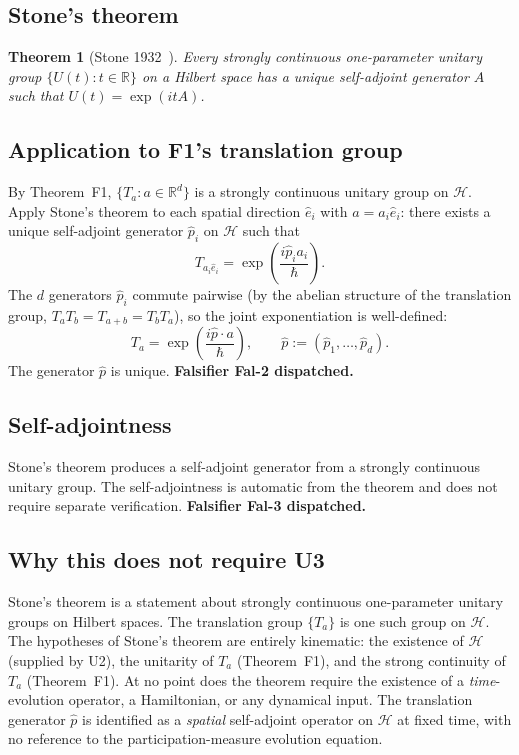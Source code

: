 \documentclass[11pt,a4paper]{article}
\newtheorem{theorem}{Theorem}[section]
\begin{document}
\subsection{Stone's theorem}

\begin{theorem}[Stone 1932~\cite{stone}]
Every strongly continuous one-parameter unitary group $\{U(t) : t \in \mathbb{R}\}$ on a Hilbert space has a unique self-adjoint generator $A$ such that $U(t) = \exp(itA)$.
\end{theorem}

\subsection{Application to F1's translation group}

By Theorem~F1, $\{T_a : a \in \mathbb{R}^d\}$ is a strongly continuous unitary group on $\mathcal{H}$. Apply Stone's theorem to each spatial direction $\hat{e}_i$ with $a = a_i \hat{e}_i$: there exists a unique self-adjoint generator $\hat{p}_i$ on $\mathcal{H}$ such that
\[
T_{a_i \hat{e}_i} = \exp\!\left(\frac{i \hat{p}_i a_i}{\hbar}\right).
\]
The $d$ generators $\hat{p}_i$ commute pairwise (by the abelian structure of the translation group, $T_a T_b = T_{a+b} = T_b T_a$), so the joint exponentiation is well-defined:
\begin{equation}
T_a = \exp\!\left(\frac{i \hat{p} \cdot a}{\hbar}\right), \qquad \hat{p} := (\hat{p}_1, \ldots, \hat{p}_d). \label{eq:Ta-stone}
\end{equation}
The generator $\hat{p}$ is unique. \textbf{Falsifier Fal-2 dispatched.}

\subsection{Self-adjointness}

Stone's theorem produces a self-adjoint generator from a strongly continuous unitary group. The self-adjointness is automatic from the theorem and does not require separate verification. \textbf{Falsifier Fal-3 dispatched.}

\subsection{Why this does not require U3}

Stone's theorem is a statement about strongly continuous one-parameter unitary groups on Hilbert spaces. The translation group $\{T_a\}$ is one such group on $\mathcal{H}$. The hypotheses of Stone's theorem are entirely kinematic: the existence of $\mathcal{H}$ (supplied by U2), the unitarity of $T_a$ (Theorem~F1), and the strong continuity of $T_a$ (Theorem~F1). At no point does the theorem require the existence of a \emph{time}-evolution operator, a Hamiltonian, or any dynamical input. The translation generator $\hat{p}$ is identified as a \emph{spatial} self-adjoint operator on $\mathcal{H}$ at fixed time, with no reference to the participation-measure evolution equation.
\end{document}
